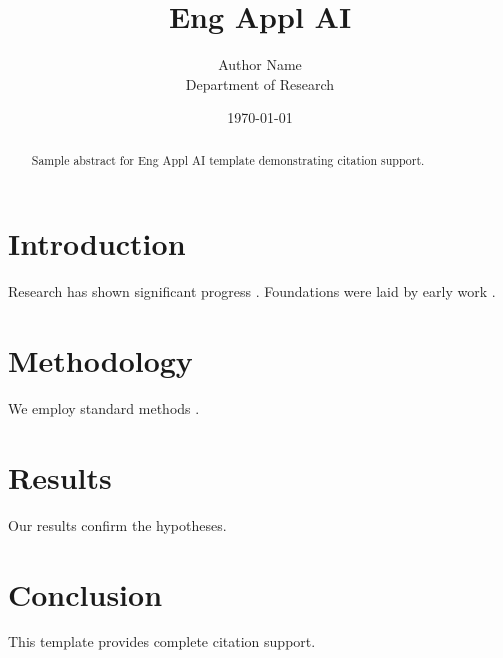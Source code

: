﻿\documentclass{elsarticle}
\title{Eng Appl AI}
\author{Author Name \\ \small Department of Research}
\date{\today}
\begin{document}
\maketitle

\begin{abstract}
Sample abstract for Eng Appl AI template demonstrating citation support.
\end{abstract}

\section{Introduction}
Research has shown significant progress \citep{einstein1905}. Foundations were laid by early work \citep{turing1950}.

\section{Methodology}
We employ standard methods \citep{knuth1984}.

\section{Results}
Our results confirm the hypotheses.

\section{Conclusion}
This template provides complete citation support.



\end{document}
